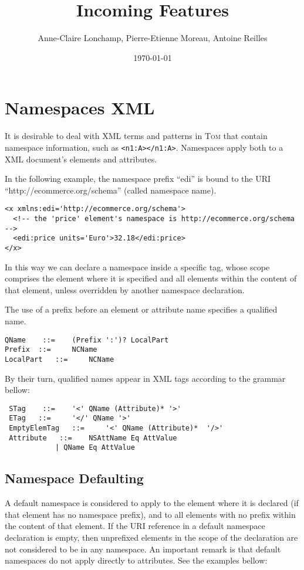 \documentclass{article}
\title{Incoming Features}
\author{Anne-Claire Lonchamp, Pierre-Etienne Moreau, Antoine Reilles}
\date\today
\newcommand{\tom}{\textsc{Tom} }
\begin{document}
\maketitle

\section{Namespaces XML}
It is desirable to deal with XML terms and patterns in \tom that contain namespace information, such as 
\verb$<n1:A></n1:A>$. Namespaces apply both to a XML document's elements and attributes. 

In the following example, the namespace prefix ``edi'' is bound to the URI ``http://ecommerce.org/schema'' (called namespace name). 

\begin{verbatim}
<x xmlns:edi='http://ecommerce.org/schema'>
  <!-- the 'price' element's namespace is http://ecommerce.org/schema -->
  <edi:price units='Euro'>32.18</edi:price>
</x>
\end{verbatim}

In this way we can declare a namespace inside a specific tag, whose scope comprises the element where it is specified and all elements within the content of that element, unless overridden by another namespace declaration. 

The use of a prefix before an element or attribute name specifies a qualified name.

\begin{verbatim}
QName 	 ::= 	(Prefix ':')? LocalPart
Prefix 	::= 	NCName
LocalPart 	::= 	NCName
\end{verbatim}


By their turn, qualified names appear in XML tags according to the grammar bellow:

\begin{verbatim}
 STag 	 ::= 	'<' QName (Attribute)* '>' 	 
 ETag 	::= 	'</' QName '>' 	
 EmptyElemTag 	::= 	'<' QName (Attribute)*  '/>' 	
 Attribute 	 ::= 	NSAttName Eq AttValue
			| QName Eq AttValue
\end{verbatim}

\subsection{Namespace Defaulting}


A default namespace is considered to apply to the element where it is declared (if that element has no namespace prefix), and to all elements with no prefix within the content of that element. If the URI reference in a default namespace declaration is empty, then unprefixed elements in the scope of the declaration are not considered to be in any namespace. An important remark is that default namespaces do not apply directly to attributes. See the examples bellow:
\end{document}
